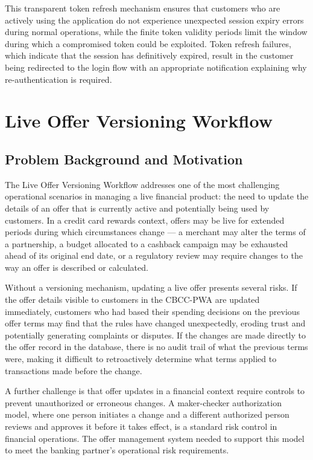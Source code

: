 This transparent token refresh mechanism ensures that customers who are actively using the application do not experience unexpected session expiry errors during normal operations, while the finite token validity periods limit the window during which a compromised token could be exploited. Token refresh failures, which indicate that the session has definitively expired, result in the customer being redirected to the login flow with an appropriate notification explaining why re-authentication is required.

\section{Live Offer Versioning Workflow}

\subsection{Problem Background and Motivation}

The Live Offer Versioning Workflow addresses one of the most challenging operational scenarios in managing a live financial product: the need to update the details of an offer that is currently active and potentially being used by customers. In a credit card rewards context, offers may be live for extended periods during which circumstances change — a merchant may alter the terms of a partnership, a budget allocated to a cashback campaign may be exhausted ahead of its original end date, or a regulatory review may require changes to the way an offer is described or calculated.

Without a versioning mechanism, updating a live offer presents several risks. If the offer details visible to customers in the CBCC-PWA are updated immediately, customers who had based their spending decisions on the previous offer terms may find that the rules have changed unexpectedly, eroding trust and potentially generating complaints or disputes. If the changes are made directly to the offer record in the database, there is no audit trail of what the previous terms were, making it difficult to retroactively determine what terms applied to transactions made before the change.

A further challenge is that offer updates in a financial context require controls to prevent unauthorized or erroneous changes. A maker-checker authorization model, where one person initiates a change and a different authorized person reviews and approves it before it takes effect, is a standard risk control in financial operations. The offer management system needed to support this model to meet the banking partner's operational risk requirements.

